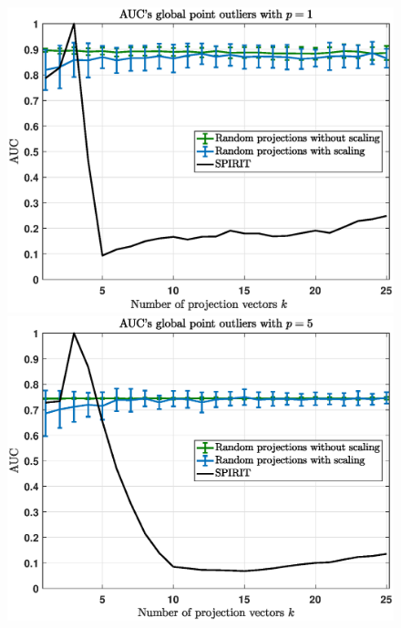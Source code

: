 \begin{figure}[h]
	\centering
	\includegraphics[scale=0.36]{analysis/AUCs_point}
	\includegraphics[scale=0.36]{analysis/AUCs_point1}
	\label{fig:app_aucs_point}
\end{figure}%

